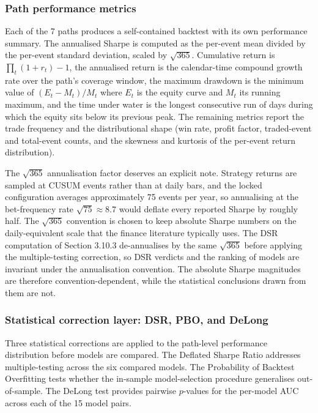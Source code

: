 \documentclass[12pt,a4paper,oneside]{article}
\begin{document}
\subsubsection{Path performance metrics}\label{subsubsec:path_metrics}

Each of the 7 paths produces a self-contained backtest with its own performance summary. The annualised Sharpe is computed as the per-event mean divided by the per-event standard deviation, scaled by $\sqrt{365}$. Cumulative return is $\prod_t (1 + r_t) - 1$, the annualised return is the calendar-time compound growth rate over the path's coverage window, the maximum drawdown is the minimum value of $(E_t - M_t) / M_t$ where $E_t$ is the equity curve and $M_t$ its running maximum, and the time under water is the longest consecutive run of days during which the equity sits below its previous peak. The remaining metrics report the trade frequency and the distributional shape (win rate, profit factor, traded-event and total-event counts, and the skewness and kurtosis of the per-event return distribution).

The $\sqrt{365}$ annualisation factor deserves an explicit note. Strategy returns are sampled at CUSUM events rather than at daily bars, and the locked configuration averages approximately 75 events per year, so annualising at the bet-frequency rate $\sqrt{75} \approx 8.7$ would deflate every reported Sharpe by roughly half. The $\sqrt{365}$ convention is chosen to keep absolute Sharpe numbers on the daily-equivalent scale that the finance literature typically uses. The DSR computation of Section 3.10.3 de-annualises by the same $\sqrt{365}$ before applying the multiple-testing correction, so DSR verdicts and the ranking of models are invariant under the annualisation convention. The absolute Sharpe magnitudes are therefore convention-dependent, while the statistical conclusions drawn from them are not.


\subsubsection{Statistical correction layer: DSR, PBO, and DeLong}\label{subsubsec:correction_layer}

Three statistical corrections are applied to the path-level performance distribution before models are compared. The Deflated Sharpe Ratio addresses multiple-testing across the six compared models. The Probability of Backtest Overfitting tests whether the in-sample model-selection procedure generalises out-of-sample. The DeLong test provides pairwise $p$-values for the per-model AUC across each of the 15 model pairs.
\end{document}
